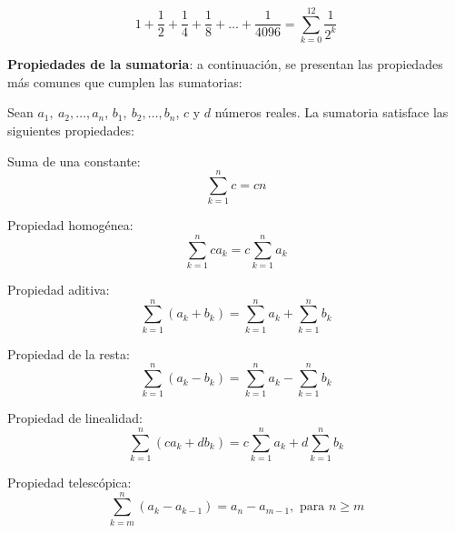 \[
  1+\frac{1}{2}+\frac{1}{4}+\frac{1}{8}+\ldots +\frac{1}{4096}=\overset{12}{
  \underset{k=0}{\sum }}\frac{1}{2^{k}}
\]

\textbf{Propiedades de la sumatoria}:\label{FormSumas} a continuación, se presentan las propiedades más comunes que cumplen las sumatorias:

\begin{prop}
  Sean $a_{1},\ a_{2},\ldots,a_{n}$, $b_{1},\ b_{2},\ldots,b_{n}$, $c$ y $d$ números reales. La sumatoria satisface las siguientes propiedades:
\end{prop}
\begin{parrafonumerado}

\item Suma de una constante:
  \[
    \sum_{k=1}^{n}c=cn
  \]

\item Propiedad homogénea:
  \[
    \sum_{k=1}^{n}ca_{k}=c
    \sum_{k=1}^{n}a_{k}
  \]

\item Propiedad aditiva:
  \[
    \sum_{k=1}^{n}
    \left( a_{k}+b_{k}\right) =\sum_{k=1}^{n}a_{k}+
    \sum_{k=1}^{n}b_{k}
  \]

\item Propiedad de la resta:
  \[
    \sum_{k=1}^{n}%
    \left( a_{k}-b_{k}\right) =\sum_{k=1}^{n}a_{k}-%
    \sum_{k=1}^{n}b_{k}
  \]

\item Propiedad de linealidad:
  \[
    \sum_{k=1}^{n}%
    \left( ca_{k}+db_{k}\right) =c\sum_{k=1}^{n}a_{k}+d%
    \sum_{k=1}^{n}b_{k}
  \]

\item Propiedad telescópica:
  \[
    \overset{n}{\underset{k=m}{\sum }}\left(
    a_{k}-a_{k-1}\right) =a_{n}-a_{m-1},\text{ para } n\geq m
  \]
\end{parrafonumerado}


